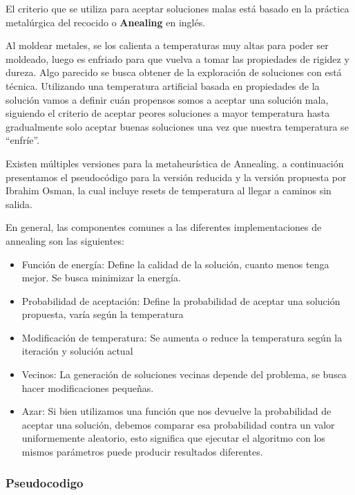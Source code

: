 El criterio que se utiliza para aceptar soluciones malas está basado en la práctica metalúrgica del recocido o \textbf{Anealing} en inglés.


Al moldear metales, se los calienta a temperaturas muy altas para poder ser moldeado, luego es enfriado para que vuelva a tomar las propiedades de rigidez y dureza. Algo parecido se busca obtener de la exploración de soluciones con está técnica.
Utilizando una temperatura artificial basada en propiedades de la solución vamos a definir cuán propensos somos a aceptar una solución mala, siguiendo el criterio de aceptar peores soluciones a mayor temperatura hasta gradualmente solo aceptar buenas soluciones una vez que nuestra temperatura se “enfríe”.


Existen múltiples versiones para la metaheurística de Annealing. a continuación presentamos el pseudocódigo para la versión reducida y la versión propuesta por Ibrahim Osman, la cual incluye resets de temperatura al llegar a caminos sin salida.

En general, las componentes comunes a las diferentes implementaciones de annealing son las siguientes:

\begin{itemize}
\item Función de energía: Define la calidad de la solución, cuanto menos tenga mejor. Se busca minimizar la energía.
\item Probabilidad de aceptación: Define la probabilidad de aceptar una solución propuesta, varía según la temperatura
\item Modificación de temperatura: Se aumenta o reduce la temperatura según la iteración y solución actual
\item Vecinos: La generación de soluciones vecinas depende del problema, se busca hacer modificaciones pequeñas.
\item Azar: Si bien utilizamos una función que nos devuelve la probabilidad de aceptar una solución, debemos comparar esa probabilidad contra un valor uniformemente aleatorio, esto significa que ejecutar el algoritmo con los mismos parámetros puede producir resultados diferentes.
\end{itemize}

\subsubsection{Pseudocodigo}

